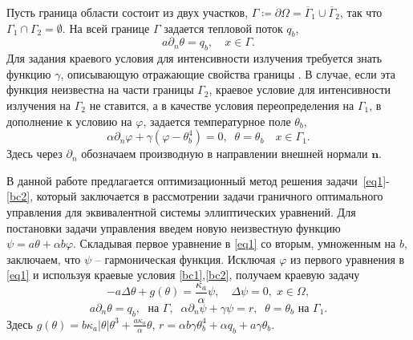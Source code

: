 \documentclass[12pt]{article}
\begin{document}
Пусть граница области состоит из двух участков, $\Gamma \coloneqq \partial \Omega =\overline{\Gamma}_1 \cup \overline{\Gamma}_2$,
так что $\Gamma_1 \cap \Gamma_2 =  \emptyset$.
На всей границе $\Gamma$ задается тепловой поток $q_b$,
\begin{equation}
        \label{bc1} 
        a\partial_n\theta = q_b, \quad x\in \Gamma.
    \end{equation}
Для задания краевого условия для интенсивности излучения
    требуется знать функцию $\gamma$, описывающую отражающие свойства границы \cite{JVM-14}.
    В случае, если эта функция неизвестна на части границы $\Gamma_2$, 
    краевое условие для интенсивности излучения на $\Gamma_2$ не ставится, а в качестве условия переопределения на $\Gamma_1$, в дополнение к условию на 
    $\varphi$, задается температурное поле $\theta_b$,
   \begin{equation}
        \label{bc2} 
        \alpha\partial_n\varphi + \gamma (\varphi - \theta_b ^4 ) = 0,\;\;
        \theta=\theta_b\quad x\in \Gamma_1.
    \end{equation} 
   Здесь через $\partial_n$ обозначаем производную в направлении
    внешней нормали $\mathbf n$.

    В данной работе предлагается оптимизационный метод решения задачи~\eqref{eq1}-\eqref{bc2}, который заключается в рассмотрении задачи граничного оптимального управления для эквивалентной системы эллиптических уравнений.
 Для постановки задачи управления введем новую неизвестную функцию 
 $\psi= a\theta + \alpha b \varphi$. Складывая первое уравнение в \eqref{eq1} со вторым, умноженным на $b$, заключаем, что $\psi$ -- гармоническая функция.
 Исключая $\varphi$ из первого уравнения в \eqref{eq1} и используя краевые условия 
 \eqref{bc1},\eqref{bc2},  получаем краевую задачу
 \begin{equation}
    \label{eq2}
    - a \Delta \theta + g (\theta) = \frac{\kappa_a}{\alpha}\psi, \quad
    \Delta \psi = 0, \; x \in \Omega,
\end{equation}
 \begin{equation}
    \label{bc3}
    a \partial_n \theta = q_b, \; \text{ на }\Gamma, \;\;
    \alpha \partial_n \psi + \gamma \psi  =  r,\;\;
    \theta = \theta_b  \text{ на }\Gamma_1.
      \end{equation}
 Здесь $g(\theta) = b \kappa_a|\theta|\theta^3 + \frac{a\kappa_a}{\alpha}\theta$, $r=\alpha b \gamma \theta_b^4+ \alpha q_b + a \gamma \theta_b$.
\end{document}
